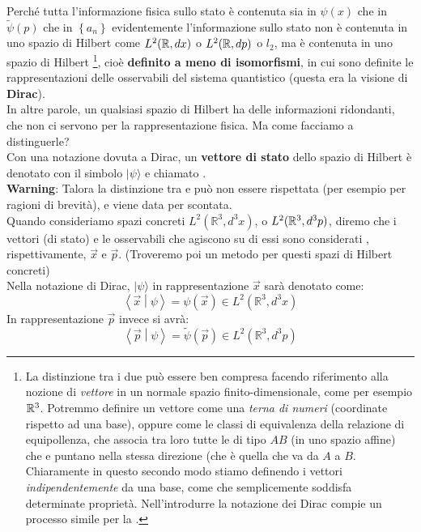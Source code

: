 \documentclass[FisicaTeorica.tex]{subfiles}
\begin{document}
Perché tutta l'informazione fisica sullo stato è contenuta sia in $\psi(x)$ che in $\tilde{\psi}(p)$ che in $\left\{a_n\right\}$ evidentemente l'informazione sullo stato non è contenuta in uno spazio di Hilbert  come $L^2(\mathbb{R},dx)$ o $L^2(\mathbb{R},dp)$ o $l_2$, ma è contenuta in uno spazio di Hilbert \footnote{La distinzione tra i due può essere ben compresa facendo riferimento alla nozione di \textit{vettore} in un normale spazio finito-dimensionale, come per esempio $\mathbb{R}^3$. Potremmo definire un vettore come una \textit{terna di numeri} (coordinate rispetto ad una base), oppure come le classi di equivalenza della relazione di equipollenza, che associa tra loro tutte le  di tipo $AB$ (in uno spazio affine) che  e puntano nella stessa direzione (che è quella che va da $A$ a $B$. Chiaramente in questo secondo modo stiamo definendo i vettori \textit{indipendentemente} da una base, come  che semplicemente soddisfa determinate proprietà. Nell'introdurre la notazione dei  Dirac compie un processo simile per la \MQ.}, cioè \textbf{definito a meno di isomorfismi}, in cui sono definite le rappresentazioni delle osservabili del sistema quantistico (questa era la visione di \textbf{Dirac}).\\
In altre parole, un qualsiasi spazio di Hilbert  ha delle informazioni ridondanti, che non ci servono per la rappresentazione fisica. Ma come facciamo a distinguerle?\\

Con una notazione dovuta a Dirac, un \textbf{vettore di stato} dello spazio di Hilbert  è denotato con il simbolo $|\psi\rangle$  e chiamato .\\ 
\textbf{Warning}: Talora la distinzione tra  e  può non essere rispettata (per esempio per ragioni di brevità), e viene data per scontata.\\
Quando consideriamo spazi concreti $L^2(\mathbb{R}^3,d^3x)$, o $L^2(\mathbb{R}^3,d^3p)$, diremo che i vettori (di stato) e le osservabili che agiscono su di essi sono considerati , rispettivamente, $\vec{x}$ e $\vec{p}$. (Troveremo poi un metodo per  questi spazi di Hilbert concreti)\\
Nella notazione di Dirac, $|\psi\rangle$ in rappresentazione $\vec{x}$ sarà denotato come:
\[
\left\langle\vec{x}\middle|\psi\right\rangle=\psi \left(\vec{x}\right)\in L^2(\mathbb{R}^3,d^3x)
\]
In rappresentazione $\vec{p}$ invece si avrà:
\[
\left\langle\vec{p}\middle|\psi\right\rangle=\tilde{\psi}\left(\vec{p}\right)\in L^2(\mathbb{R}^3,d^3p)
\]
\end{document}
